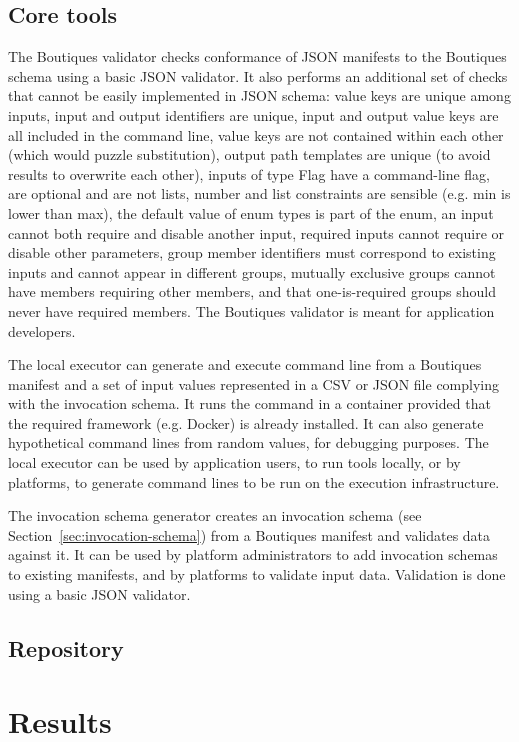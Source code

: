 \documentclass{article}
\begin{document}
\subsection{Core tools} 

The Boutiques validator checks conformance of JSON manifests to the
Boutiques schema using a basic JSON validator. It also performs an
additional set of checks that cannot be easily implemented in JSON
schema: value keys are unique among inputs, input and output
identifiers are unique, input and output value keys are all
included in the command line, value keys are not contained
within each other (which would puzzle substitution), output path
templates are unique (to avoid results to overwrite each other),
inputs of type Flag have a command-line flag, are optional and are not
lists, number and list constraints are sensible (e.g. min is lower
than max), the default value of enum types is part of the enum, an
input cannot both require and disable another input, required inputs
cannot require or disable other parameters, group member identifiers
must correspond to existing inputs and cannot appear in different
groups, mutually exclusive groups cannot have members requiring other
members, and that one-is-required groups should never have required
members. The Boutiques validator is meant for application developers.

The local executor can generate and execute command line from a
Boutiques manifest and a set of input values represented in a CSV or
JSON file complying with the invocation schema. It runs the
command in a container provided that the required framework
(e.g. Docker) is already installed. It can also generate hypothetical
command lines from random values, for debugging purposes. The local
executor can be used by application users, to run tools locally, or by
platforms, to generate command lines to be run on the execution
infrastructure.

The invocation schema generator creates an invocation schema (see
Section~\ref{sec:invocation-schema}) from a Boutiques manifest and
validates data against it. It can be used by platform administrators
to add invocation schemas to existing manifests, and by platforms to
validate input data. Validation is done using a basic JSON
validator.

\subsection{Repository}

\section{Results}
\end{document}

